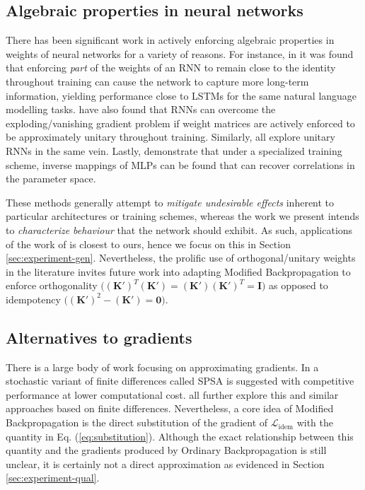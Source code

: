 \documentclass{article}
\theoremstyle{plain}
\theoremstyle{definition}
\theoremstyle{remark}
\newcommand{\vI}{\mathbf{I}}
\newcommand{\vK}{\mathbf{K}}
\begin{document}
\subsection{Algebraic properties in neural networks}
There has been significant work in actively enforcing algebraic properties in weights of neural networks for a variety of reasons. For instance, in \citealt{mikolov-rnn,le-rnn-relu} it was found that enforcing \textit{part} of the weights of an RNN to remain close to the identity throughout training can cause the network to capture more long-term information, yielding performance close to LSTMs for the same natural language modelling tasks. \citealt{arjovsky-rnn} have also found that RNNs can overcome the exploding/vanishing gradient problem if weight matrices are actively enforced to be approximately unitary throughout training. Similarly, \citealt{saxe-isometry,kiani-projunn,jing-tunable-unn} all explore unitary RNNs in the same vein. Lastly, \citealt{ardizzone-inv} demonstrate that under a specialized training scheme, inverse mappings of MLPs can be found that can recover correlations in the parameter space.

These methods generally attempt to \textit{mitigate undesirable effects} inherent to particular architectures or training schemes, whereas the work we present intends to \textit{characterize behaviour} that the network should exhibit. As such, applications of the work of \citealt{shocher-ign} is closest to ours, hence we focus on this in Section \ref{sec:experiment-gen}. Nevertheless, the prolific use of orthogonal/unitary weights in the literature invites future work into adapting Modified Backpropagation to enforce orthogonality ${\big((\vK')^T(\vK')=(\vK')(\vK')^T=\vI\big)}$ as opposed to idempotency ${\big((\vK')^2 - (\vK') = \bm{0}\big)}$.


\subsection{Alternatives to gradients}
There is a large body of work focusing on approximating gradients. In \citealt{spall-perturb} a stochastic variant of finite differences called SPSA is suggested with competitive performance at lower computational cost. \citealt{scheinberg-approx,do-approx,bandler-approx} all further explore this and similar approaches based on finite differences. Nevertheless, a core idea of Modified Backpropagation is the direct substitution of the gradient of $\mathcal{L}_{\mathrm{idem}}$ with the quantity in Eq. (\ref{eq:substitution}). Although the exact relationship between this quantity and the gradients produced by Ordinary Backpropagation is still unclear, it is certainly not a direct approximation as evidenced in Section \ref{sec:experiment-qual}.
\end{document}
